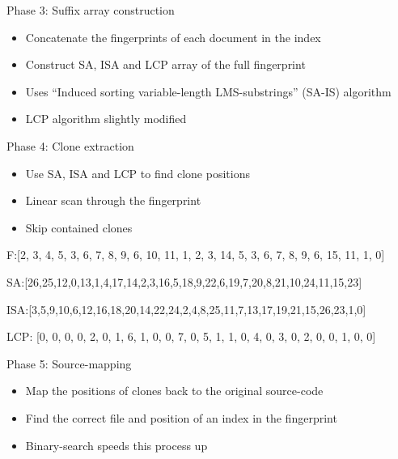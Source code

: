 \documentclass[aspectratio=1610, xcolor=table]{beamer}
\begin{document}
\begin{frame}[fragile]{Phase 3: Suffix array construction}
    \begin{itemize}
        \item Concatenate the fingerprints of each document in the index
        \item Construct SA, ISA and LCP array of the full fingerprint
        \item Uses ``Induced sorting variable-length LMS-substrings'' (SA-IS) algorithm
        \item LCP algorithm slightly modified
    \end{itemize}

\end{frame}

\begin{frame}{Phase 4: Clone extraction}
    \begin{itemize}
        \item Use SA, ISA and LCP to find clone positions
        \item Linear scan through the fingerprint
        \item Skip contained clones
    \end{itemize}
    \begin{center}
        F:[2, 3, 4, 5, 3, 6, 7, 8, 9, 6, 10, 11, 1, 2, 3, 14, 5, 3, 6, 7, 8, 9, 6, 15, 11, 1, 0]

        SA:[26,25,12,0,13,1,4,17,14,2,3,16,5,18,9,22,6,19,7,20,8,21,10,24,11,15,23]

        ISA:[3,5,9,10,6,12,16,18,20,14,22,24,2,4,8,25,11,7,13,17,19,21,15,26,23,1,0]

        LCP: [0, 0, 0, 0, 2, 0, 1, 6, 1, 0, 0, 7, 0, 5, 1, 1, 0, 4, 0, 3, 0, 2, 0, 0, 1, 0, 0]
    \end{center}
\end{frame}

\begin{frame}{Phase 5: Source-mapping}
    \begin{itemize}
        \item Map the positions of clones back to the original source-code
        \item Find the correct file and position of an index in the fingerprint
        \item Binary-search speeds this process up
    \end{itemize}
\end{frame}
\end{document}
